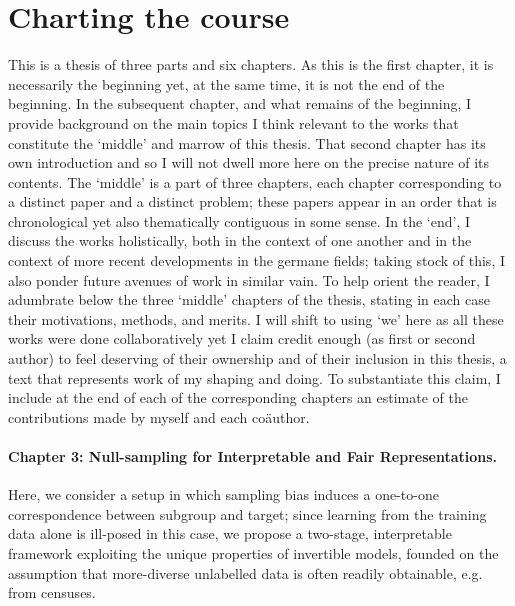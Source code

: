 %
%



%
\section{Charting the course}\label{sec:charting}
%
This is a thesis of three parts and six chapters. 
%
As this is the first chapter, it is necessarily the beginning yet, at the same time, it is not the
end of the beginning. 
%
In the subsequent chapter, and what remains of the beginning, I provide background on the main
topics I think relevant to the works that constitute the `middle' and marrow of this thesis.
%
That second chapter has its own introduction and so I will not dwell more here on the precise
nature of its contents.
%
The `middle' is a part of three chapters, each chapter corresponding to a distinct paper and a
distinct problem; these papers appear in an order that is chronological yet also thematically
contiguous in some sense.
%
In the `end', I discuss the works holistically, both in the context of one another and in the
context of more recent developments in the germane fields; taking stock of this, I also ponder
future avenues of work in similar vain.
%
To help orient the reader, I adumbrate below the three `middle' chapters of the thesis, stating
in each case their motivations, methods, and merits. 
%
I will shift to using `we' here as all these works were done collaboratively yet I claim credit
enough (as first or second author) to feel deserving of their ownership and of their inclusion in
this thesis, a text that represents work of my shaping and doing.
%
To substantiate this claim, I include at the end of each of the corresponding chapters an estimate
of the contributions made by myself and each co{\"a}uthor.

\paragraph{Chapter 3: Null-sampling for Interpretable and Fair Representations.}
%
Here, we consider a setup in which sampling bias induces a one-to-one correspondence between
subgroup and target; since learning from the training data alone is ill-posed in this case, we
propose a two-stage, interpretable framework exploiting the unique properties of invertible models,
founded on the assumption that more-diverse unlabelled data is often readily obtainable, e.g. from
censuses.

